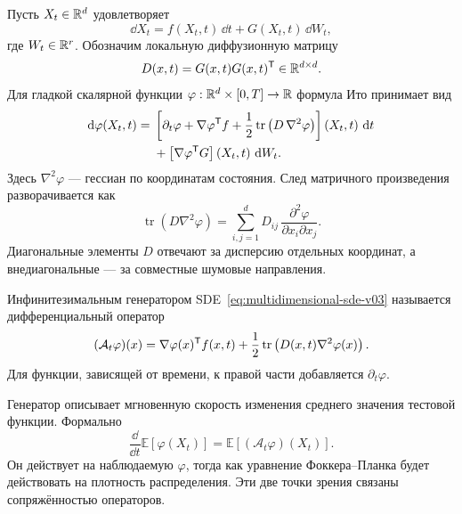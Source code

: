 Пусть $X_t\in\mathbb{R}^d$ удовлетворяет
\begin{equation}
\label{eq:multidimensional-sde-v03}
\dd X_t
=
f(X_t,t)\,\dd t
+
G(X_t,t)\,\dd W_t,
\end{equation}
где $W_t\in\mathbb{R}^r$. Обозначим локальную диффузионную матрицу
\begin{equation}
\label{eq:diffusion-matrix-v03}
D(x,t)=G(x,t)G(x,t)^{\mathsf{T}}\in\mathbb{R}^{d\times d}.
\end{equation}
Для гладкой скалярной функции $\varphi:\mathbb{R}^d\times[0,T]\to\mathbb{R}$ формула Ито принимает вид
\begin{equation}
\label{eq:ito-formula-vector-v03}
\begin{aligned}
\mathop{}\!\mathrm{d}\varphi(X_t,t)
={}&
\left[
\partial_t\varphi
+
\nabla\varphi^{\mathsf{T}}f
+
\frac12\operatorname{tr}
\left(D\,\nabla^2\varphi\right)
\right](X_t,t)\,\mathop{}\!\mathrm{d} t
\\
&+
\left[\nabla\varphi^{\mathsf{T}}G\right](X_t,t)\,\mathop{}\!\mathrm{d} W_t.
\end{aligned}
\end{equation}
Здесь $\nabla^2\varphi$ --- гессиан по координатам состояния. След матричного произведения разворачивается как
\[
\operatorname{tr}(D\nabla^2\varphi)
=
\sum_{i,j=1}^{d}
D_{ij}\,
\frac{\partial^2\varphi}{\partial x_i\partial x_j}.
\]
Диагональные элементы $D$ отвечают за дисперсию отдельных координат, а внедиагональные --- за совместные шумовые направления.

\begin{definition}
Инфинитезимальным генератором SDE~\eqref{eq:multidimensional-sde-v03} называется дифференциальный оператор
\begin{equation}
\label{eq:generator-v03}
(\mathcal A_t\varphi)(x)
=
\nabla\varphi(x)^{\mathsf{T}}f(x,t)
+
\frac12
\operatorname{tr}
\left(D(x,t)\nabla^2\varphi(x)\right).
\end{equation}
Для функции, зависящей от времени, к правой части добавляется $\partial_t\varphi$.
\end{definition}

Генератор описывает мгновенную скорость изменения среднего значения тестовой функции. Формально
\begin{equation}
\label{eq:generator-expectation-v03}
\frac{\dd}{\dd t}\mathbb E[\varphi(X_t)]
=
\mathbb E[(\mathcal A_t\varphi)(X_t)].
\end{equation}
Он действует на наблюдаемую $\varphi$, тогда как уравнение Фоккера--Планка будет действовать на плотность распределения. Эти две точки зрения связаны сопряжённостью операторов.

